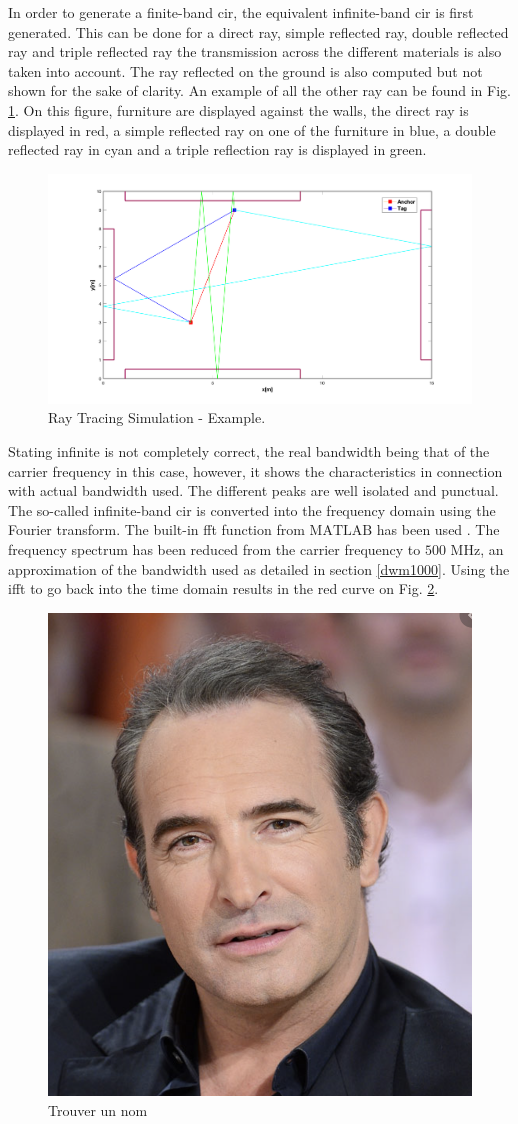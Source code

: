 In order to generate a finite-band \gls{cir}, the equivalent infinite-band \gls{cir} is first generated. This can be done for a direct ray, simple reflected ray, double reflected ray and triple reflected ray the transmission across the different materials is also taken into account. The ray reflected on the ground is also computed but not shown for the sake of clarity. An example of all the other ray can be found in Fig. \ref{fig:ray_simu}. On this figure, furniture are displayed against the walls, the direct ray is displayed in red, a simple reflected ray on one of the furniture in blue, a double reflected ray in cyan and a triple reflection ray is displayed in green.

\begin{figure}[H]
\centering
\includegraphics[width=.75\linewidth]{Images/rays_example.png}
\caption{Ray Tracing Simulation - Example. \label{fig:ray_simu}}
\end{figure}

Stating infinite is not completely correct, the real bandwidth being that of the carrier frequency in this case, however, it shows the characteristics in connection with actual bandwidth used. The different peaks are well isolated and punctual. The so-called infinite-band \gls{cir} is converted into the frequency domain using the Fourier transform. The built-in \gls{fft} function from $\text{MATLAB}$ has been used \cite{mathworks}. The frequency spectrum has been reduced from the carrier frequency to $\text{500 MHz}$, an approximation of the bandwidth used as detailed in section \ref{dwm1000}. Using the \gls{ifft} to go back into the time domain results in the red curve on Fig. \ref{fig:conv_fin}.

\begin{figure}[H]
\centering
\includegraphics[width=.2\linewidth]{Images/Temporary_pic.png}
\caption{Trouver un nom \label{fig:conv_fin}}
\end{figure}

